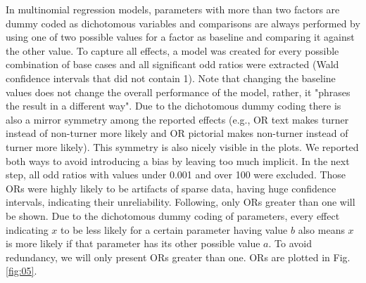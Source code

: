 \documentclass{frontiersSCNS} %
\begin{document}
In multinomial regression models, parameters with more than two factors are dummy coded as dichotomous variables and comparisons are always performed by using one of two possible values for a factor as baseline and comparing it against the other value. To capture all effects, a model was created for every possible combination of base cases and all significant odd ratios were extracted (Wald confidence intervals that did not contain 1). Note that changing the baseline values does not change the overall performance of the model, rather, it "phrases the result in a different way". 
Due to the dichotomous dummy coding there is also a mirror symmetry among the reported effects (e.g., OR text makes turner instead of non-turner more likely and OR pictorial makes non-turner instead of turner more likely). This symmetry is also nicely visible in the plots. We reported both ways to avoid introducing a bias by leaving too much implicit.
In the next step, all odd ratios with values under 0.001 and over 100 were excluded. Those ORs were highly likely to be artifacts of sparse data, having huge confidence intervals, indicating their unreliability. 
Following, only ORs greater than one will be shown. Due to the dichotomous dummy coding of parameters, every effect indicating $x$ to be less likely for a certain parameter having value $b$ also means $x$ is more likely if that parameter has its other possible value $a$. To avoid redundancy, we will only present ORs greater than one. ORs are plotted in Fig. \ref{fig:05}.
\end{document}
